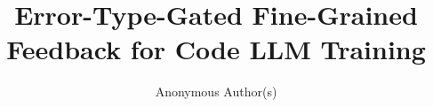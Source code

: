 \documentclass{article}
\title{Error-Type-Gated Fine-Grained Feedback for Code LLM Training}
\author{
  Anonymous Author(s)
}
\date{}
\begin{document}
\maketitle

\begin{abstract}

\end{abstract}











\end{document}
